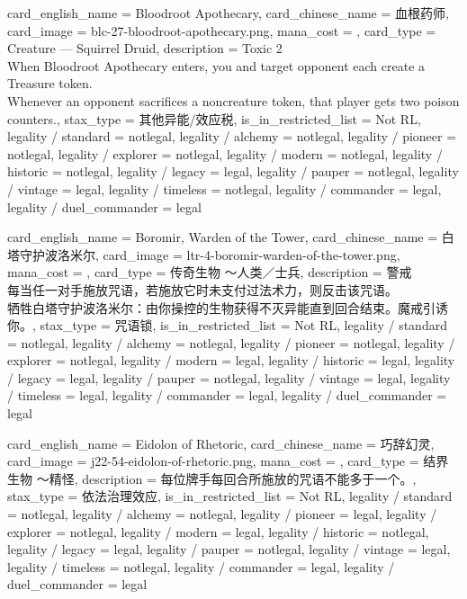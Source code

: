 \documentclass[lang = cn, color = black, 10pt]{AllThatStax}
\begin{document}
\card
{
	card_english_name = {Bloodroot Apothecary},
	card_chinese_name = {血根药师},
	card_image = blc-27-bloodroot-apothecary.png,
	mana_cost = ,
	card_type = Creature — Squirrel Druid,
	description = {Toxic 2 \\
		When Bloodroot Apothecary enters, you and target opponent each create a Treasure token.\\
		Whenever an opponent sacrifices a noncreature token, that player gets two poison counters.},
	stax_type = 其他异能/效应税,
	is_in_restricted_list = Not RL,
	legality / standard = notlegal,
	legality / alchemy = notlegal,
	legality / pioneer = notlegal,
	legality / explorer = notlegal,
	legality / modern = notlegal,
	legality / historic = notlegal,
	legality / legacy = legal,
	legality / pauper = notlegal,
	legality / vintage = legal,
	legality / timeless = notlegal,
	legality / commander = legal,
	legality / duel_commander = legal
}

\card
{
	card_english_name = {Boromir, Warden of the Tower},
	card_chinese_name = {白塔守护波洛米尔},
	card_image = ltr-4-boromir-warden-of-the-tower.png,
	mana_cost = ,
	card_type = 传奇生物 ～人类／士兵,
	description = {警戒\\
		每当任一对手施放咒语，若施放它时未支付过法术力，则反击该咒语。\\
		牺牲白塔守护波洛米尔：由你操控的生物获得不灭异能直到回合结束。魔戒引诱你。},
	stax_type = 咒语锁,
	is_in_restricted_list = Not RL,
	legality / standard = notlegal,
	legality / alchemy = notlegal,
	legality / pioneer = notlegal,
	legality / explorer = notlegal,
	legality / modern = legal,
	legality / historic = legal,
	legality / legacy = legal,
	legality / pauper = notlegal,
	legality / vintage = legal,
	legality / timeless = legal,
	legality / commander = legal,
	legality / duel_commander = legal
}

\card
{
	card_english_name = {Eidolon of Rhetoric},
	card_chinese_name = {巧辞幻灵},
	card_image = j22-54-eidolon-of-rhetoric.png,
	mana_cost = ,
	card_type = 结界生物 ～精怪,
	description = {每位牌手每回合所施放的咒语不能多于一个。},
	stax_type = 依法治理效应,
	is_in_restricted_list = Not RL,
	legality / standard = notlegal,
	legality / alchemy = notlegal,
	legality / pioneer = legal,
	legality / explorer = notlegal,
	legality / modern = legal,
	legality / historic = notlegal,
	legality / legacy = legal,
	legality / pauper = notlegal,
	legality / vintage = legal,
	legality / timeless = notlegal,
	legality / commander = legal,
	legality / duel_commander = legal
}
\end{document}
